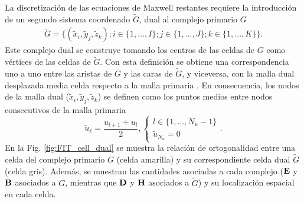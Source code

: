 La discretización de las ecuaciones de Maxwell restantes requiere la introducción de un segundo sistema coordenado $\tilde{G}$, dual al complejo primario $G$ \cite{hadabSolutionMaxwellsEquation2023}
%
\begin{align}
	\tilde{G}=\{(\tilde{x}_i,\tilde{y}_j,\tilde{z}_k); i\in\{1,...,I\};j\in\{1,...,J\};k\in\{1,...,K\}\}.
\end{align}
%
 Este complejo dual se construye tomando los centros de las celdas de $G$ como vértices de las celdas de $\tilde{G}$. Con esta definición se obtiene una correspondencia uno a uno entre las aristas de $G$ y las caras de $\tilde{G}$, y viceversa, con la malla dual desplazada media celda respecto a la malla primaria \cite{clemensDiscreteElectromagnetismFinite2001}. En consecuencia, los nodos de la malla dual ($\tilde{x}_i,\tilde{y}_j,\tilde{z}_k$) se definen como los puntos medios entre nodos consecutivos de la malla primaria \cite{hadabSolutionMaxwellsEquation2023}
 \begin{equation}
 	 \tilde{u}_{\ell} =\dfrac{u_{l+1}+u_l}{2}, \begin{cases}
 		 l \in \{1,...,N_u-1\}\\
 		\tilde{u}_{N_u}=0
 	\end{cases}.
 \end{equation}
 En la Fig. \ref{fig:FIT_cell_dual} se muestra la relación de ortogonalidad entre una celda del complejo primario $G$ (celda amarilla) y su correspondiente celda dual $\tilde{G}$ (celda gris). Además, se muestran las cantidades asociadas a cada complejo ($\vb{E}$ y $\vb{B}$ asociados a $G$, mientras que $\vb{D}$ y $\vb{H}$ asociados a $\tilde{G}$) y su localización espacial en cada celda.
 
